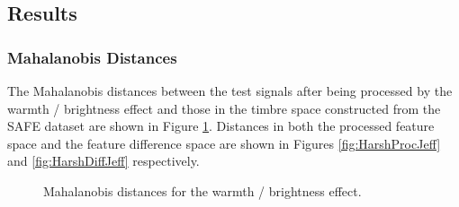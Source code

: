 	\subsection{Results}
	\label{sec:PerceptualExperiments-SemanticControl-Results}
		\subsubsection{Mahalanobis Distances}
			The Mahalanobis distances between the test signals after being processed by the warmth / brightness
			effect and those in the timbre space constructed from the SAFE dataset are shown in Figure
			\ref{fig:HarshJeffs}. Distances in both the processed feature space and the feature difference
			space are shown in Figures \ref{fig:HarshProcJeff} and \ref{fig:HarshDiffJeff} respectively.

			\begin{figure}[h!]
				\centering
				\quad
				\caption{Mahalanobis distances for the warmth / brightness effect.}
				\label{fig:HarshJeffs}
			\end{figure}

